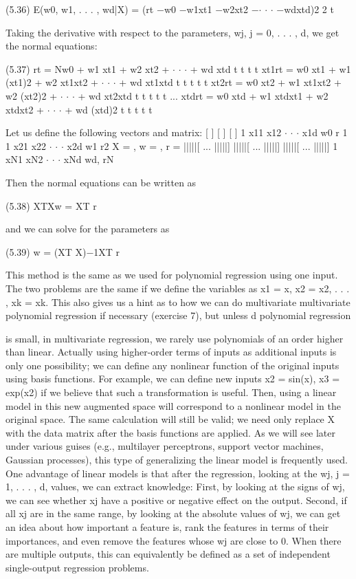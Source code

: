 (5.36) E(w0, w1, . . . , wd|X) = (rt $-$w0 $-$w1xt1 $-$w2xt2 $-$$\cdot$ $\cdot$ $\cdot$ $-$wdxtd)2 2 t

Taking the derivative with respect to the parameters, wj, j = 0, . . . , d, we get the normal equations:

(5.37) rt = Nw0 + w1 xt1 + w2 xt2 + $\cdot$ $\cdot$ $\cdot$ + wd xtd t t t t xt1rt = w0 xt1 + w1 (xt1)2 + w2 xt1xt2 + $\cdot$ $\cdot$ $\cdot$ + wd xt1xtd t t t t t xt2rt = w0 xt2 + w1 xt1xt2 + w2 (xt2)2 + $\cdot$ $\cdot$ $\cdot$ + wd xt2xtd t t t t t ... xtdrt = w0 xtd + w1 xtdxt1 + w2 xtdxt2 + $\cdot$ $\cdot$ $\cdot$ + wd (xtd)2 t t t t t

Let us define the following vectors and matrix: [ ] [ ] [ ] 1 x11 x12 $\cdot$ $\cdot$ $\cdot$ x1d w0 r 1 1 x21 x22 $\cdot$ $\cdot$ $\cdot$ x2d w1 r2 X = , w = , r = |||||[ ... |||||] |||||[ ... |||||] |||||[ ... |||||] 1 xN1 xN2 $\cdot$ $\cdot$ $\cdot$ xNd wd, rN

Then the normal equations can be written as

(5.38) XTXw = XT r

and we can solve for the parameters as

(5.39) w = (XT X)$-$1XT r

This method is the same as we used for polynomial regression using one input. The two problems are the same if we define the variables as x1 = x, x2 = x2, . . . , xk = xk. This also gives us a hint as to how we can do multivariate multivariate polynomial regression if necessary (exercise 7), but unless d polynomial regression

is small, in multivariate regression, we rarely use polynomials of an order higher than linear. Actually using higher-order terms of inputs as additional inputs is only one possibility; we can define any nonlinear function of the original inputs using basis functions. For example, we can define new inputs x2 = sin(x), x3 = exp(x2) if we believe that such a transformation is useful. Then, using a linear model in this new augmented space will correspond to a nonlinear model in the original space. The same calculation will still be valid; we need only replace X with the data matrix after the basis functions are applied. As we will see later under various guises (e.g., multilayer perceptrons, support vector machines, Gaussian processes), this type of generalizing the linear model is frequently used. One advantage of linear models is that after the regression, looking at the wj, j = 1, . . . , d, values, we can extract knowledge: First, by looking at the signs of wj, we can see whether xj have a positive or negative effect on the output. Second, if all xj are in the same range, by looking at the absolute values of wj, we can get an idea about how important a feature is, rank the features in terms of their importances, and even remove the features whose wj are close to 0. When there are multiple outputs, this can equivalently be defined as a set of independent single-output regression problems.

